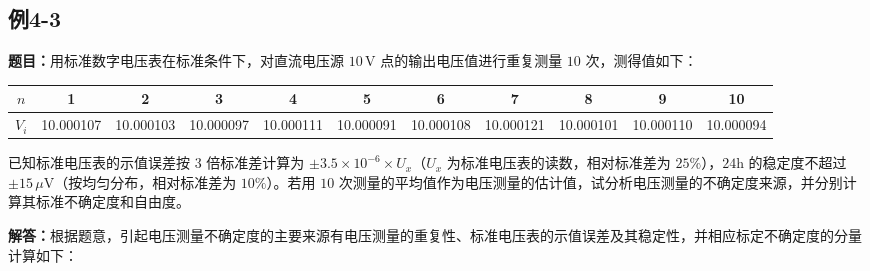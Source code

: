 \documentclass[UTF8,zihao=-4]{ctexart}
\newcommand{\problem}[1]{\subsection*{#1}}
\newcommand{\timu}{\noindent\textbf{题目：}}
\newcommand{\jieda}{\noindent\textbf{解答：}}
\begin{document}
\problem{例4-3}

\timu 用标准数字电压表在标准条件下，对直流电压源 $10\,\mathrm{V}$ 点的输出电压值进行重复测量 $10$ 次，测得值如下：

\begin{center}
\scriptsize
\setlength{\tabcolsep}{6pt}
\begin{tabular}{c|cccccccccc}
\toprule
$n$ & 1 & 2 & 3 & 4 & 5 & 6 & 7 & 8 & 9 & 10\\
\midrule
$V_i$ & 10.000107 & 10.000103 & 10.000097 & 10.000111 & 10.000091 & 10.000108 & 10.000121 & 10.000101 & 10.000110 & 10.000094\\
\bottomrule
\end{tabular}
\end{center}

已知标准电压表的示值误差按 $3$ 倍标准差计算为 $\pm3.5\times10^{-6}\times U_x$（$U_x$ 为标准电压表的读数，相对标准差为 $25\%$），$24\mathrm{h}$ 的稳定度不超过 $\pm15\,\mu\mathrm{V}$（按均匀分布，相对标准差为 $10\%$）。若用 $10$ 次测量的平均值作为电压测量的估计值，试分析电压测量的不确定度来源，并分别计算其标准不确定度和自由度。

\jieda 根据题意，引起电压测量不确定度的主要来源有电压测量的重复性、标准电压表的示值误差及其稳定性，并相应标定不确定度的分量计算如下：
\end{document}
